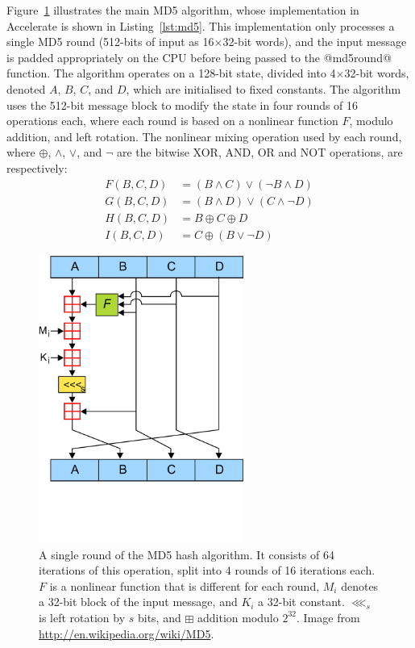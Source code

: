 Figure~\ref{fig:md5_round} illustrates the main MD5 algorithm, whose
implementation in Accelerate is shown in Listing~\ref{lst:md5}. This
implementation only processes a single MD5 round (512-bits of input as
16$\times$32-bit words), and the input message is padded appropriately on the
CPU before being passed to the @md5round@ function. The algorithm operates on a
128-bit state, divided into 4$\times$32-bit words, denoted $A$, $B$, $C$, and
$D$, which are initialised to fixed constants. The algorithm uses the 512-bit
message block to modify the state in four rounds of 16 operations each, where
each round is based on a nonlinear function $F$, modulo addition, and left
rotation. The nonlinear mixing operation used by each round, where $\oplus$,
$\wedge$, $\vee$, and $\neg$ are the bitwise XOR, AND, OR and NOT operations,
are respectively:
%
\begin{align*}
    F(B,C,D) &= (B \wedge C) \vee (\neg B \wedge D) \\
    G(B,C,D) &= (B \wedge D) \vee (C \wedge \neg D) \\
    H(B,C,D) &= B \oplus C \oplus D \\
    I(B,C,D) &= C \oplus (B \vee \neg D)
\end{align*}


\begin{figure}
    \centering
    \includegraphics[width=0.6\textwidth]{images/results/MD5/MD5}
    \caption[A single round of the MD5 hash algorithm]{A single round of the MD5
        hash algorithm. It consists of 64 iterations of this operation, split
        into 4 rounds of 16 iterations each. $F$ is a nonlinear function that is
        different for each round, $M_i$ denotes a 32-bit block of the input
        message, and $K_i$ a 32-bit constant. $\lll_s$ is left rotation by $s$
        bits, and $\boxplus$ addition modulo $2^{32}$. Image from
        \url{http://en.wikipedia.org/wiki/MD5}.}
    \label{fig:md5_round}
\end{figure}


